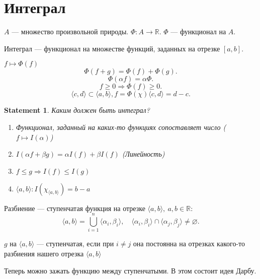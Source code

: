 \documentclass[11pt]{book}
\newcommand{\R}{\mathbb{R}}
\renewcommand{\le}{\leqslant}
\renewcommand{\ge}{\geqslant}
\theoremstyle{definition}
\theoremstyle{plain}
\theoremstyle{plain}
\newtheorem*{st}{Statement}
\theoremstyle{definition}
\theoremstyle{remark}
\begin{document}
\section{Интеграл}
\begin{defn}
    $ A$ --- множество произвольной природы. $ \Phi: A \to  \R$. $ \Phi$ --- функционал на $ A$.
\end{defn}
\begin{defn}
    Интеграл --- функционал на множестве функций, заданных на отрезке $ [a, b]$.

    $ f \mapsto \Phi (f)$
    \[
	\Phi(f+g) = \Phi(f) + \Phi(g)
    .\]
    \[
	\Phi( \alpha  f) = \alpha \Phi
    .\]
    \[
	f \ge  0 \Longrightarrow \Phi(f) \ge 0
    .\]
    \[
	\langle c, d \rangle \subset \langle a, b \rangle, f= \Phi(\chi)  \langle c, d \rangle = d - c
    .\]
\end{defn}
\begin{st}
    Каким должен быть интеграл?
    \begin{enumerate}
	\item Функционал, заданный на каких-то функциях сопоставляет число ($ f \mapsto I( \alpha )$)
	\item $ I( \alpha  f + \beta  g) = \alpha I(f) + \beta I ( f ) $ (Линейность)
	\item $ f \le  g \Longrightarrow I(f) \le  I(g)$
	\item $  \langle a, b \rangle: I(\chi _{ \langle a, b \rangle} ) = b - a$
    \end{enumerate}
\end{st}
\begin{defn}
    Разбиение --- ступенчатая функция на отрезке $ \langle a, b \rangle, ~ a, b \in  \R:$
    \[
	\langle a, b \rangle = \bigcup_{i= 1}^{n} \langle \alpha _i, \beta _i \rangle, \quad \langle \alpha_i , \beta _i \rangle\cap \langle \alpha _j, \beta _j \rangle  \ne \varnothing
    .\]
\end{defn}
\begin{defn}
    $ g $  на $ \langle a, b \rangle$ --- ступенчатая, если при $ i \ne j$ она постоянна  на отрезках какого-то разбиения нашего отрезка $ \langle a, b \rangle$
\end{defn}
Теперь можно зажать функцию между ступенчатыми. В этом состоит идея Дарбу.
\end{document}
